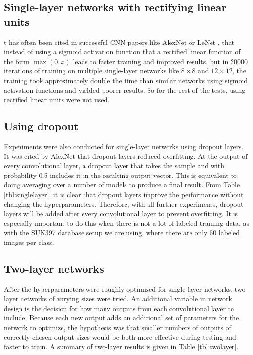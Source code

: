 \documentclass[10pt]{article}
\begin{document}
\subsection{Single-layer networks with rectifying linear units}

t has often been cited in successful CNN papers like AlexNet or LeNet \cite{krizhevsky_imagenet_2012}, \cite{lecun_handwritten_1990} that instead of using a sigmoid activation function that a rectified linear function of the form $\max(0, x)$ leads to faster training and improved results, but in 20000 iterations of training on multiple single-layer networks like $8 \times 8$ and $12 \times 12$, the training took approximately double the time than similar networks using sigmoid activation functions and yielded poorer results. So for the rest of the tests, using rectified linear units were not used.

\subsection{Using dropout}

Experiments were also conducted for single-layer networks using dropout layers. It was cited by AlexNet \cite{krizhevsky_imagenet_2012} that dropout layers reduced overfitting. At the output of every convolutional layer, a dropout layer that takes the sample and with probability 0.5 includes it in the resulting output vector. This is equivalent to doing averaging over a number of models to produce a final result. From Table \ref{tbl:singlelayer}, it is clear that dropout layers improve the performance without changing the hyperparameters. Therefore, with all further experiments, dropout layers will be added after every convolutional layer to prevent overfitting. It is especially important to do this when there is not a lot of labeled training data, as with the SUN397 database setup we are using, where there are only 50 labeled images per class.

\subsection{Two-layer networks}

After the hyperparameters were roughly optimized for single-layer networks, two-layer networks of varying sizes were tried. An additional variable in network design is the decision for how many outputs from each convolutional layer to include. Because each new output adds an additional set of parameters for the network to optimize, the hypothesis was that smaller numbers of outputs of correctly-chosen output sizes would be both more effective during testing and faster to train. A summary of two-layer results is given in Table \ref{tbl:twolayer}.
\end{document}
